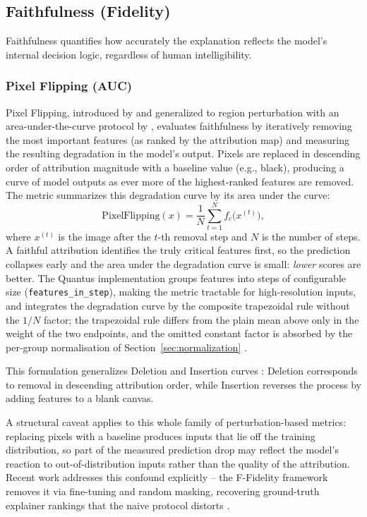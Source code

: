 \subsection{Faithfulness (Fidelity)}
Faithfulness quantifies how accurately the explanation reflects the model's internal decision logic, regardless of human intelligibility.

\subsubsection{Pixel Flipping (AUC)}
Pixel Flipping, introduced by \citet{bach2015lrp} and generalized to region
perturbation with an area-under-the-curve protocol by \citet{pixelflip},
evaluates faithfulness by iteratively removing the most important features (as
ranked by the attribution map) and measuring the resulting degradation in the
model's output.
Pixels are replaced in descending order of attribution magnitude with a baseline value (e.g., black), producing a curve of model outputs as ever more of the highest-ranked features are removed. The metric summarizes this degradation curve by its area under the curve:
\begin{equation}
    \text{PixelFlipping}(x) = \frac{1}{N} \sum_{t=1}^{N} f_c\bigl(x^{(t)}\bigr),
\end{equation}
where $x^{(t)}$ is the image after the $t$-th removal step and $N$ is the number of steps. A faithful attribution identifies the truly critical features first, so the prediction collapses early and the area under the degradation curve is small: \emph{lower} scores are better. The Quantus implementation groups features into steps of configurable size (\texttt{features\_in\_step}), making the metric tractable for high-resolution inputs, and integrates the degradation curve by the composite trapezoidal rule without the $1/N$ factor; the trapezoidal rule differs from the plain mean above only in the weight of the two endpoints, and the omitted constant factor is absorbed by the per-group normalisation of Section~\ref{sec:normalization} \cite{hedstrom2023quantus}.

This formulation generalizes Deletion and Insertion curves \cite{petsiuk2018rise}: Deletion corresponds to removal in descending attribution order, while Insertion reverses the process by adding features to a blank canvas.

A structural caveat applies to this whole family of perturbation-based metrics: replacing pixels with a baseline produces inputs that lie off the training distribution, so part of the measured prediction drop may reflect the model's reaction to out-of-distribution inputs rather than the quality of the attribution. Recent work addresses this confound explicitly -- the F-Fidelity framework removes it via fine-tuning and random masking, recovering ground-truth explainer rankings that the naive protocol distorts \citep{zheng2025ffidelity}.

